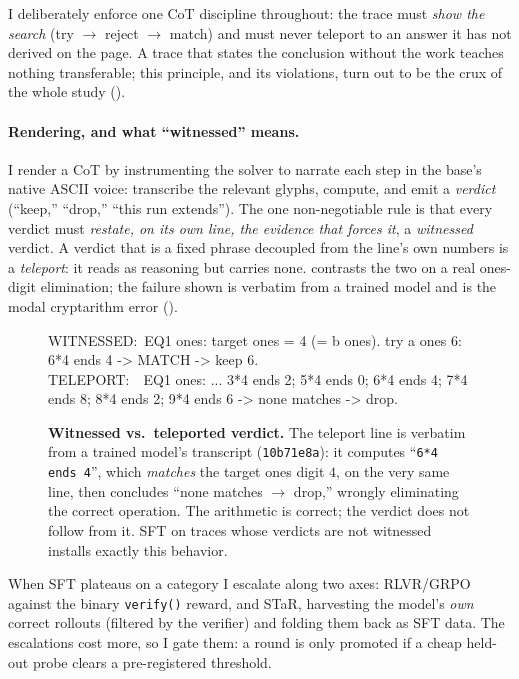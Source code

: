\documentclass[11pt]{article}
\begin{document}
I deliberately enforce one CoT discipline throughout: the trace must \emph{show the search}
(try $\to$ reject $\to$ match) and must never teleport to an answer it has not derived on
the page. A trace that states the conclusion without the work teaches nothing transferable;
this principle, and its violations, turn out to be the crux of the whole study
().

\paragraph{Rendering, and what ``witnessed'' means.} I render a CoT by instrumenting the
solver to narrate each step in the base's native ASCII voice: transcribe the relevant glyphs,
compute, and emit a \emph{verdict} (``keep,'' ``drop,'' ``this run extends''). The one
non-negotiable rule is that every verdict must \emph{restate, on its own line, the evidence
that forces it}, a \emph{witnessed} verdict. A verdict that is a fixed phrase decoupled from
the line's own numbers is a \emph{teleport}: it reads as reasoning but carries none.
 contrasts the two on a real ones-digit elimination; the failure shown is
verbatim from a trained model and is the modal cryptarithm error ().

\begin{figure}[htbp]
\centering
\begin{cotbox}[title=\normalfont\bfseries Witnessed verdict (rendered) vs.\ verdict-as-token (emitted)]
WITNESSED:\ EQ1 ones: target ones = 4 (= b ones). try a ones 6: 6*4 ends 4 -> MATCH -> keep 6.\\[2pt]
TELEPORT:\ \ EQ1 ones: ... 3*4 ends 2; 5*4 ends 0; 6*4 ends 4; 7*4 ends 8; 8*4 ends 2; 9*4 ends 6 -> none matches -> drop.
\end{cotbox}
\caption{\textbf{Witnessed vs.\ teleported verdict.} The teleport line is verbatim from a
trained model's transcript (\texttt{10b71e8a}): it computes ``\texttt{6*4 ends 4}'', which
\emph{matches} the target ones digit $4$, on the very same line, then concludes ``none matches
$\to$ drop,'' wrongly eliminating the correct operation. The arithmetic is correct; the verdict
does not follow from it. SFT on traces whose verdicts are not witnessed installs exactly this
behavior.}
\label{fig:cot}
\end{figure}

When SFT plateaus on a category I escalate along two axes: RLVR/GRPO against the binary
\texttt{verify()} reward, and STaR, harvesting the model's \emph{own} correct rollouts
(filtered by the verifier) and folding them back as SFT data. The escalations cost more, so
I gate them: a round is only promoted if a cheap held-out probe clears a pre-registered
threshold.
\end{document}
